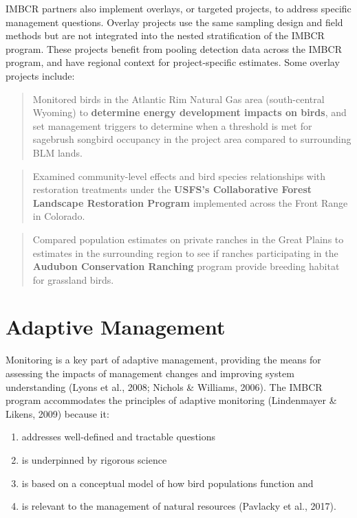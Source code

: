 \documentclass[
  letterpaper,
  DIV=11,
  numbers=noendperiod,
  oneside]{scrreprt}
\providecommand{\tightlist}{%
  \setlength{\itemsep}{0pt}\setlength{\parskip}{0pt}}\usepackage{longtable,booktabs,array}
\begin{document}
IMBCR partners also implement overlays, or targeted projects, to address
specific management questions. Overlay projects use the same sampling
design and field methods but are not integrated into the nested
stratification of the IMBCR program. These projects benefit from pooling
detection data across the IMBCR program, and have regional context for
project-specific estimates. Some overlay projects include:

\begin{quote}
Monitored birds in the Atlantic Rim Natural Gas area (south-central
Wyoming) to \textbf{determine energy development impacts on birds}, and
set management triggers to determine when a threshold is met for
sagebrush songbird occupancy in the project area compared to surrounding
BLM lands.
\end{quote}

\begin{quote}
Examined community-level effects and bird species relationships with
restoration treatments under the \textbf{USFS's Collaborative Forest
Landscape Restoration Program} implemented across the Front Range in
Colorado.
\end{quote}

\begin{quote}
Compared population estimates on private ranches in the Great Plains to
estimates in the surrounding region to see if ranches participating in
the \textbf{Audubon Conservation Ranching} program provide breeding
habitat for grassland birds.
\end{quote}

\hypertarget{adaptive-management}{%
\section{Adaptive Management}\label{adaptive-management}}

Monitoring is a key part of adaptive management, providing the means for
assessing the impacts of management changes and improving system
understanding (Lyons et al., 2008; Nichols \& Williams, 2006). The IMBCR
program accommodates the principles of adaptive monitoring (Lindenmayer
\& Likens, 2009) because it:

\begin{enumerate}
\def\labelenumi{\arabic{enumi}.}
\tightlist
\item
  addresses well-defined and tractable questions\\
\item
  is underpinned by rigorous science
\item
  is based on a conceptual model of how bird populations function and\\
\item
  is relevant to the management of natural resources (Pavlacky et al.,
  2017).
\end{enumerate}
\end{document}
